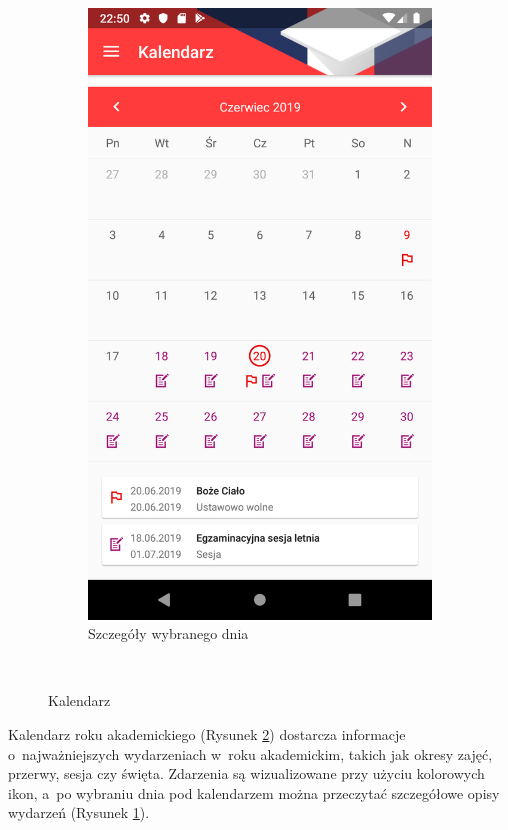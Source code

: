 \documentclass{pracamgr}
\begin{document}
\begin{figure}[p]
\begin{subfigure}[t]{0.3\textwidth}
		\includegraphics[width=\textwidth]{img/calendar_selected.png}
		\caption{Szczegóły wybranego dnia}
		\label{fig:calendar_item}
	\end{subfigure}
	\\
	\caption{Kalendarz}\label{fig:calendar}
	\medskip
\end{figure}

Kalendarz roku akademickiego (Rysunek \ref{fig:calendar}) dostarcza informacje
o~najważniejszych wydarzeniach w~roku akademickim, takich jak okresy zajęć, przerwy, sesja czy
święta. Zdarzenia są wizualizowane przy użyciu kolorowych ikon, a~po wybraniu dnia pod
kalendarzem można przeczytać szczegółowe opisy wydarzeń (Rysunek \ref{fig:calendar_item}).
\end{document}
